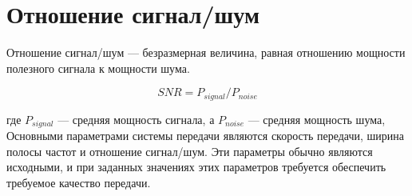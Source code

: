 \section{Отношение сигнал/шум}
Отношение сигнал/шум --- безразмерная величина, равная отношению мощности полезного сигнала к мощности шума.

\[ SNR=P_{signal}/P_{noise} \]

где $P_{signal}$ --- средняя мощность сигнала, а $P_{noise}$ --- средняя мощность шума,
Основными параметрами системы передачи являются скорость передачи, ширина полосы частот и отношение сигнал/шум. Эти параметры обычно являются исходными, и при заданных значениях этих параметров требуется обеспечить требуемое качество передачи.